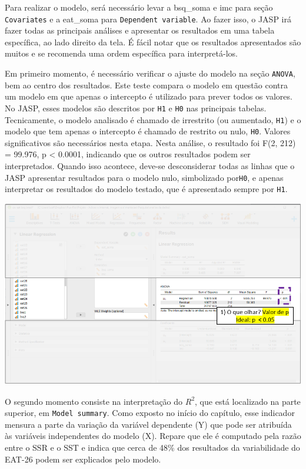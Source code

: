 \documentclass[
]{book}
\begin{document}
Para realizar o modelo, será necessário levar a bsq\_soma e imc para seção \texttt{Covariates} e a eat\_soma para \texttt{Dependent\ variable}. Ao fazer isso, o JASP irá fazer todas as principais análises e apresentar os resultados em uma tabela específica, ao lado direito da tela. É fácil notar que os resultados apresentados são muitos e se recomenda uma ordem específica para interpretá-los.

Em primeiro momento, é necessário verificar o ajuste do modelo na seção \texttt{ANOVA}, bem ao centro dos resultados. Este teste compara o modelo em questão contra um modelo em que apenas o intercepto é utilizado para prever todos os valores. No JASP, esses modelos são descritos por \texttt{H1} e \texttt{H0} nas principais tabelas. Tecnicamente, o modelo analisado é chamado de irrestrito (ou aumentado, \texttt{H1}) e o modelo que tem apenas o intercepto é chamado de restrito ou nulo, \texttt{H0}. Valores significativos são necessários nesta etapa. Nesta análise, o resultado foi F(2, 212) = 99.976, p \textless{} 0.0001, indicando que os outros resultados podem ser interpretados. Quando isso acontece, deve-se desconsiderar todas as linhas que o JASP apresentar resultados para o modelo nulo, simbolizado por\texttt{H0}, e apenas interpretar os resultados do modelo testado, que é apresentado sempre por \texttt{H1}.

\includegraphics{./img/cap_reg_multipla_resultado_1.png}

O segundo momento consiste na interpretação do \(R^2\), que está localizado na parte superior, em \texttt{Model\ summary}. Como exposto no início do capítulo, esse indicador mensura a parte da variação da variável dependente (Y) que pode ser atribuída às variáveis independentes do modelo (X). Repare que ele é computado pela razão entre o SSR e o SST e indica que cerca de 48\% dos resultados da variabilidade do EAT-26 podem ser explicados pelo modelo.
\end{document}
